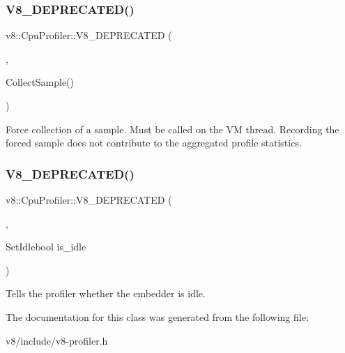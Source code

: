 \subsubsection{\texorpdfstring{V8\+\_\+\+D\+E\+P\+R\+E\+C\+A\+T\+E\+D()}{V8\_DEPRECATED()}\hspace{0.1cm}{\footnotesize\ttfamily [1/2]}}
{\footnotesize\ttfamily v8\+::\+Cpu\+Profiler\+::\+V8\+\_\+\+D\+E\+P\+R\+E\+C\+A\+T\+ED (\begin{DoxyParamCaption}\item[{\char`\"{}Use static \mbox{\hyperlink{classv8_1_1CpuProfiler_a88b787078f0c8742b3c077af0de4f46b}{Collect\+Sample}}(Isolate$\ast$) instead.\char`\"{}}]{,  }\item[{void }]{Collect\+Sample() }\end{DoxyParamCaption})}

Force collection of a sample. Must be called on the VM thread. Recording the forced sample does not contribute to the aggregated profile statistics. \mbox{\label{classv8_1_1CpuProfiler_aa5a41d80d7d262f2c171a4382f2fbd4f}} 
\subsubsection{\texorpdfstring{V8\+\_\+\+D\+E\+P\+R\+E\+C\+A\+T\+E\+D()}{V8\_DEPRECATED()}\hspace{0.1cm}{\footnotesize\ttfamily [2/2]}}
{\footnotesize\ttfamily v8\+::\+Cpu\+Profiler\+::\+V8\+\_\+\+D\+E\+P\+R\+E\+C\+A\+T\+ED (\begin{DoxyParamCaption}\item[{\char`\"{}Use Isolate\+::\+Set\+Idle(bool) instead.\char`\"{}}]{,  }\item[{void }]{Set\+Idlebool is\+\_\+idle }\end{DoxyParamCaption})}

Tells the profiler whether the embedder is idle. 

The documentation for this class was generated from the following file\+:\begin{DoxyCompactItemize}
\item 
v8/include/v8-\/profiler.\+h\end{DoxyCompactItemize}
